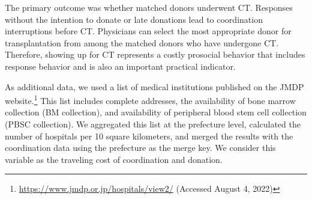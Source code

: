 \documentclass[12pt, a4paper]{article}
\begin{document}
The primary outcome was whether matched donors underwent CT. Responses without the intention to donate or late donations lead to coordination interruptions before CT. Physicians can select the most appropriate donor for transplantation from among the matched donors who have undergone CT. Therefore, showing up for CT represents a costly prosocial behavior that includes response behavior and is also an important practical indicator.

As additional data, we used a list of medical institutions published on the JMDP website.\footnote{\url{https://www.jmdp.or.jp/hospitals/view2/} (Accessed August 4, 2022)} This list includes complete addresses, the availability of bone marrow collection (BM collection), and availability of peripheral blood stem cell collection (PBSC collection). We aggregated this list at the prefecture level, calculated the number of hospitals per 10 square kilometers, and merged the results with the coordination data using the prefecture as the merge key. We consider this variable as the traveling cost of coordination and donation.
\end{document}

